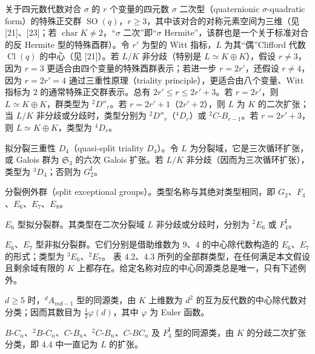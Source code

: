 关于四元数代数对合 $\sigma$ 的 $r$ 个变量的四元数 $\sigma$ 二次型（quaternionic $\sigma$-quadratic form）的特殊正交群 $\operatorname{SO}(q)$，$r\geq3$，其中该对合的对称元素空间为三维（见 [21]、[23]；若 $\operatorname{char}K\ne2$，“$\sigma$ 二次”即“$\sigma$ Hermite”，该群也是一个关于标准对合的反 Hermite 型的特殊酉群）。令 $r'$ 为型的 Witt 指标，$L$ 为其“偶”Clifford 代数 $\operatorname{Cl}(q)$ 的中心（见 [21]）。若 $L/K$ 非分歧（特别是 $L\simeq K\oplus K$），假设 $r\ne3$，因为 $r=3$ 更适合由四个变量的特殊酉群表示；若进一步 $r=2r'$，还假设 $r\ne4$，因为 $r=2r'=4$ 通过三重性原理（triality principle），更适合由八个变量、Witt 指标为 $2$ 的通常特殊正交群表示。总有 $2r'\leq r\leq2r'+3$。若 $r=2r'$，则 $L\simeq K\oplus K$，群类型为 ${}^2D''_r$。若 $r=2r'+1$（$2r'+2$），则 $L$ 为 $K$ 的二次扩张；当 $L/K$ 非分歧或分歧时，类型分别为 ${}^2D''_r$（${}^4D_r$）或 ${}^2C$-$B_{r-1}$。若 $r=2r'+3$，则 $L\simeq K\oplus K$，类型为 ${}^4D_r$。

拟分裂三重性 $D_4$（quasi-split triality $D_4$）。令 $L$ 为分裂域，它是三次循环扩张，或 Galois 群为 $\mathfrak S_3$ 的六次 Galois 扩张。若 $L/K$ 非分歧（因而为三次循环扩张），类型为 ${}^3D_4$；否则为 $G_2^{\mathrm I}$。

分裂例外群（split exceptional groups）。类型名称与其绝对类型相同，即 $G_2$、$F_4$、$E_6$、$E_7$、$E_8$。

$E_6$ 型拟分裂群。其类型在二次分裂域 $L$ 非分歧或分歧时，分别为 ${}^2E_6$ 或 $F_4^{\mathrm I}$。

$E_6$、$E_7$ 型非拟分裂群。它们分别是借助维数为 $9$、$4$ 的中心除代数构造的 $E_6$、$E_7$ 的形式；类型为 ${}^3E_6$、${}^2E_7$。
表 4.2、4.3 所列的全部群类型，在任何满足本文假设且剩余域有限的 $K$ 上都存在。给定名称对应的中心同源类总是唯一，只有下述例外。

$d\geq5$ 时，${}^dA_{md-1}$ 型的同源类，由 $K$ 上维数为 $d^2$ 的互为反代数的中心除代数对分类；因而其数目为 $\frac12\varphi(d)$，其中 $\varphi$ 为 Euler 函数。

$B$-$C_n$、${}^2B$-$C_n$、$C$-$B_n$、${}^2C$-$B_n$、$C$-$BC_n$ 及 $F_4^{\mathrm I}$ 型的同源类，由 $K$ 的分歧二次扩张分类，即 4.4 中一直记为 $L$ 的扩张。

